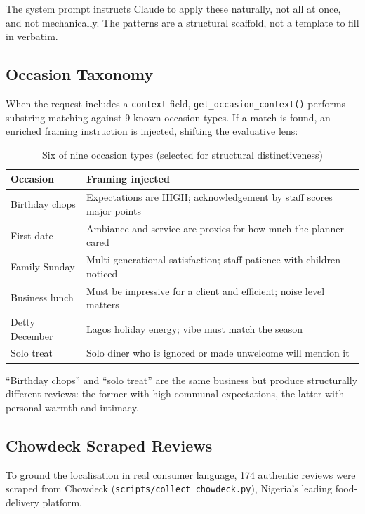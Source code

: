 \documentclass[11pt]{article}
\begin{document}
The system prompt instructs Claude to apply these naturally, not all at once, and not mechanically. The patterns are a structural scaffold, not a template to fill in verbatim.

\subsection{Occasion Taxonomy}
\label{sec:occasion}

When the request includes a \texttt{context} field, \texttt{get\_occasion\_context()} performs substring matching against 9 known occasion types. If a match is found, an enriched framing instruction is injected, shifting the evaluative lens:

\begin{table}[h]
\centering
\begin{tabularx}{\textwidth}{lX}
\toprule
\textbf{Occasion} & \textbf{Framing injected} \\
\midrule
Birthday chops & Expectations are HIGH; acknowledgement by staff scores major points \\
First date & Ambiance and service are proxies for how much the planner cared \\
Family Sunday & Multi-generational satisfaction; staff patience with children noticed \\
Business lunch & Must be impressive for a client and efficient; noise level matters \\
Detty December & Lagos holiday energy; vibe must match the season \\
Solo treat & Solo diner who is ignored or made unwelcome will mention it \\
\bottomrule
\end{tabularx}
\caption{Six of nine occasion types (selected for structural distinctiveness)}
\end{table}

``Birthday chops'' and ``solo treat'' are the same business but produce structurally different reviews: the former with high communal expectations, the latter with personal warmth and intimacy.

\subsection{Chowdeck Scraped Reviews}

To ground the localisation in real consumer language, 174 authentic reviews were scraped from Chowdeck (\texttt{scripts/collect\_chowdeck.py}), Nigeria's leading food-delivery platform.
\end{document}
